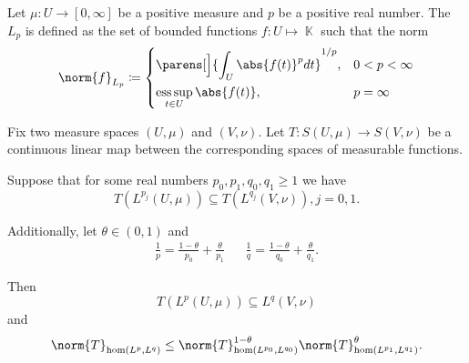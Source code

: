 \begin{definition}\label{def:lebesgue_space}
  Let \( \mu: U \to [0, \infty] \) be a positive measure and \( p \) be a positive real number. The  \( L_p \) is defined as the set of bounded functions \( f: U \mapsto \BbbK \) such that the norm
  \begin{equation*}
    \norm{f}_{L_p} \coloneqq \begin{dcases}
      \parens[\Big]{\int_U \abs{f(t)}^p dt}^{1/p}, &0 < p < \infty \\
      \ess\sup_{t \in U} \abs{f(t)} , &p = \infty
    \end{dcases}
  \end{equation*}
\end{definition}

\begin{theorem}\label{thm:riesz_thorin}
  Fix two measure spaces \( (U, \mu) \) and \( (V, \nu) \). Let \( T: S(U, \mu) \to S(V, \nu) \) be a continuous linear map between the corresponding spaces of measurable functions.

  Suppose that for some real numbers \( p_0, p_1, q_0, q_1 \geq 1 \) we have
  \begin{equation*}
    T(L^{p_j}(U, \mu)) \subseteq T(L^{q_j}(V, \nu)), j = 0, 1.
  \end{equation*}

  Additionally, let \( \theta \in (0, 1) \) and
  \begin{align*}
    \frac 1 p = \frac {1 - \theta} {p_0} + \frac {\theta} {p_1}
    &&
    \frac 1 q = \frac {1 - \theta} {q_0} + \frac {\theta} {q_1}.
  \end{align*}

  Then
  \begin{equation*}
    T(L^p(U, \mu)) \subseteq L^q(V, \nu)
  \end{equation*}
  and
  \begin{equation*}
    \norm{T}_{\hom(L^p, L^q)} \leq \norm{T}_{\hom(L^{p_0}, L^{q_0})}^{1 - \theta} \norm{T}_{\hom(L^{p_1}, L^{q_1})}^\theta.
  \end{equation*}
\end{theorem}

